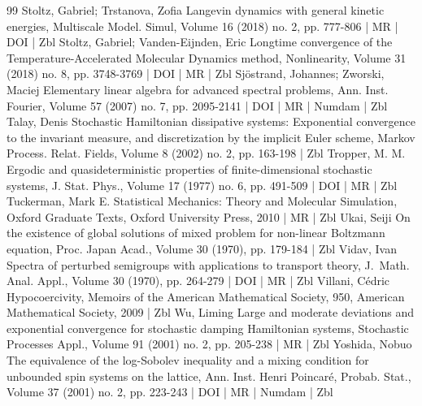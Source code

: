 \documentclass[10pt]{amsart}
\theoremstyle{definition}\newtheorem{defi}[theo]{Definition}\newtheorem{rema}[theo]{Remark}\newtheorem{exam}[theo]{Example}\newtheorem{exem}[theo]{Example}\newtheorem{nota}[theo]{Notation}
\begin{document}
\begin{thebibliography}{99}
Stoltz, Gabriel; Trstanova, Zofia Langevin dynamics with general kinetic energies, Multiscale Model. Simul, Volume 16 (2018) no. 2, pp. 777-806 | MR | DOI | Zbl
Stoltz, Gabriel; Vanden-Eijnden, Eric Longtime convergence of the Temperature-Accelerated Molecular Dynamics method, Nonlinearity, Volume 31 (2018) no. 8, pp. 3748-3769 | DOI | MR | Zbl
Sjöstrand, Johannes; Zworski, Maciej Elementary linear algebra for advanced spectral problems, Ann. Inst. Fourier, Volume 57 (2007) no. 7, pp. 2095-2141 | DOI | MR | Numdam | Zbl
Talay, Denis Stochastic Hamiltonian dissipative systems: Exponential convergence to the invariant measure, and discretization by the implicit Euler scheme, Markov Process. Relat. Fields, Volume 8 (2002) no. 2, pp. 163-198 | Zbl
Tropper, M. M. Ergodic and quasideterministic properties of finite-dimensional stochastic systems, J. Stat. Phys., Volume 17 (1977) no. 6, pp. 491-509 | DOI | MR | Zbl
Tuckerman, Mark E. Statistical Mechanics: Theory and Molecular Simulation, Oxford Graduate Texts, Oxford University Press, 2010 | MR | Zbl
Ukai, Seiji On the existence of global solutions of mixed problem for non-linear Boltzmann equation, Proc. Japan Acad., Volume 30 (1970), pp. 179-184 | Zbl
Vidav, Ivan Spectra of perturbed semigroups with applications to transport theory, J. Math. Anal. Appl., Volume 30 (1970), pp. 264-279 | DOI | MR | Zbl
Villani, Cédric Hypocoercivity, Memoirs of the American Mathematical Society, 950, American Mathematical Society, 2009 | Zbl
Wu, Liming Large and moderate deviations and exponential convergence for stochastic damping Hamiltonian systems, Stochastic Processes Appl., Volume 91 (2001) no. 2, pp. 205-238 | MR | Zbl
Yoshida, Nobuo The equivalence of the log-Sobolev inequality and a mixing condition for unbounded spin systems on the lattice, Ann. Inst. Henri Poincaré, Probab. Stat., Volume 37 (2001) no. 2, pp. 223-243 | DOI | MR | Numdam | Zbl
\end{thebibliography}
\end{document}
